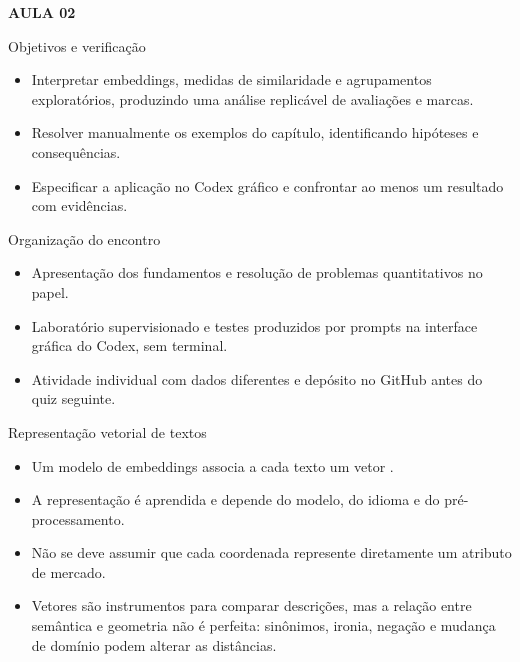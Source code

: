 \documentclass[10pt,aspectratio=169]{beamer}
\begin{document}
\begin{frame}[t]{}
\vspace{14mm}\textcolor{InsperRed}{\bfseries AULA 02}\par\vspace{4mm}{\LARGE\bfseries Embeddings e similaridade semântica}\par\vspace{6mm}{\large Marketing Analítico}\par{}
\end{frame}

\begin{frame}[t]{Objetivos e verificação}
\small
\begin{itemize}
\item Interpretar embeddings, medidas de similaridade e agrupamentos exploratórios, produzindo uma análise replicável de avaliações e marcas.
\item Resolver manualmente os exemplos do capítulo, identificando hipóteses e consequências.
\item Especificar a aplicação no Codex gráfico e confrontar ao menos um resultado com evidências.
\end{itemize}
\end{frame}

\begin{frame}[t]{Organização do encontro}
\small
\begin{itemize}
\item Apresentação dos fundamentos e resolução de problemas quantitativos no papel.
\item Laboratório supervisionado e testes produzidos por prompts na interface gráfica do Codex, sem terminal.
\item Atividade individual com dados diferentes e depósito no GitHub antes do quiz seguinte.
\end{itemize}
\end{frame}

\begin{frame}[t]{Representação vetorial de textos}
\small
\begin{itemize}
\item Um modelo de embeddings associa a cada texto um vetor .
\item A representação é aprendida e depende do modelo, do idioma e do pré-processamento.
\item Não se deve assumir que cada coordenada represente diretamente um atributo de mercado.
\item Vetores são instrumentos para comparar descrições, mas a relação entre semântica e geometria não é perfeita: sinônimos, ironia, negação e mudança de domínio podem alterar as distâncias.
\end{itemize}
\end{frame}
\end{document}
